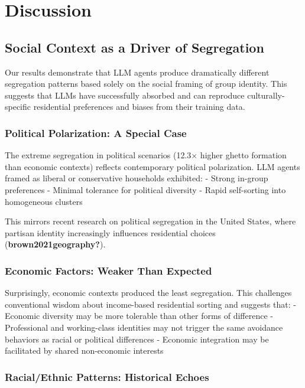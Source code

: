 \documentclass[
  11pt,
]{article}
\begin{document}
\section{Discussion}\label{discussion}

\subsection{Social Context as a Driver of
Segregation}\label{social-context-as-a-driver-of-segregation}

Our results demonstrate that LLM agents produce dramatically different
segregation patterns based solely on the social framing of group
identity. This suggests that LLMs have successfully absorbed and can
reproduce culturally-specific residential preferences and biases from
their training data.

\subsubsection{Political Polarization: A Special
Case}\label{political-polarization-a-special-case}

The extreme segregation in political scenarios (12.3× higher ghetto
formation than economic contexts) reflects contemporary political
polarization. LLM agents framed as liberal or conservative households
exhibited: - Strong in-group preferences - Minimal tolerance for
political diversity - Rapid self-sorting into homogeneous clusters

This mirrors recent research on political segregation in the United
States, where partisan identity increasingly influences residential
choices (\textbf{brown2021geography?}).

\subsubsection{Economic Factors: Weaker Than
Expected}\label{economic-factors-weaker-than-expected}

Surprisingly, economic contexts produced the least segregation. This
challenges conventional wisdom about income-based residential sorting
and suggests that: - Economic diversity may be more tolerable than other
forms of difference - Professional and working-class identities may not
trigger the same avoidance behaviors as racial or political differences
- Economic integration may be facilitated by shared non-economic
interests

\subsubsection{Racial/Ethnic Patterns: Historical
Echoes}\label{racialethnic-patterns-historical-echoes}
\end{document}
